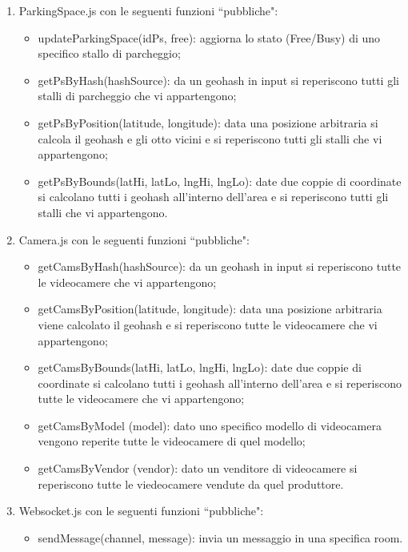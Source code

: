 \begin{enumerate}
	\item ParkingSpace.js con le seguenti funzioni ``pubbliche":
	\begin{itemize}
			\item updateParkingSpace(idPs, free): aggiorna lo stato (Free/Busy) di uno specifico stallo di parcheggio;
			\item getPsByHash(hashSource): da un geohash in input si reperiscono tutti gli stalli di parcheggio che vi appartengono;
			\item getPsByPosition(latitude, longitude): data una posizione arbitraria si calcola il geohash e gli otto vicini e si reperiscono tutti gli stalli che vi appartengono;
			\item getPsByBounds(latHi, latLo, lngHi, lngLo): date due coppie di coordinate si calcolano tutti i geohash all'interno dell'area e si reperiscono tutti gli stalli che vi appartengono.
		\end{itemize}

	\item Camera.js con le seguenti funzioni ``pubbliche":
	\begin{itemize}
			\item getCamsByHash(hashSource): da un geohash in input si reperiscono tutte le videocamere che vi appartengono;
			\item getCamsByPosition(latitude, longitude): data una posizione arbitraria viene calcolato il geohash e si reperiscono tutte le videocamere che vi appartengono;
			\item getCamsByBounds(latHi, latLo, lngHi, lngLo): date due coppie di coordinate si calcolano tutti i geohash all'interno dell'area e si reperiscono tutte le videocamere che vi appartengono;
			\item getCamsByModel (model): dato uno specifico modello di videocamera vengono reperite tutte le videocamere di quel modello;
			\item getCamsByVendor (vendor): dato un venditore di videocamere si reperiscono tutte le viedeocamere vendute da quel produttore.
	\end{itemize}

	\item Websocket.js con le seguenti funzioni ``pubbliche":
	\begin{itemize}
		\item sendMessage(channel, message): invia un messaggio in una specifica room.
	\end{itemize}
\end{enumerate}


